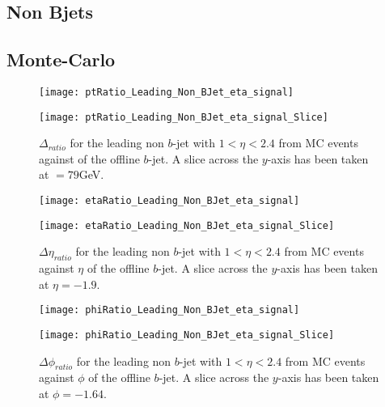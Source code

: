 	\subsection{Non Bjets}

	\subsection{Monte-Carlo}

	\begin{figure}[h]
		\centering
		\begin{minipage}[h]{0.33\linewidth}
			\texttt{[image: ptRatio\_Leading\_Non\_BJet\_eta\_signal]}

		\end{minipage}
		\quad
		\begin{minipage}[h]{0.33\linewidth}
			\texttt{[image: ptRatio\_Leading\_Non\_BJet\_eta\_signal\_Slice]}
		\end{minipage}
		\caption{$\Delta $\pt$_{ratio}$ for the leading \pt non $b$-jet with $1 < \eta < 2.4$ from MC events against \pt of the offline $b$-jet. A slice across the $y$-axis has been taken at \pt$=79$GeV. }
		\label{fig:MC:leadingnonbptcore}
	\end{figure}

	\begin{figure}[h]
		\centering

		\begin{minipage}[h]{0.33\linewidth}
			\texttt{[image: etaRatio\_Leading\_Non\_BJet\_eta\_signal]}
		\end{minipage}
		\quad
		\begin{minipage}[h]{0.33\linewidth}
			\texttt{[image: etaRatio\_Leading\_Non\_BJet\_eta\_signal\_Slice]}
		\end{minipage}
		\caption{$\Delta \eta_{ratio}$ for the leading \pt non $b$-jet with $1 < \eta < 2.4$ from MC events against $\eta$ of the offline $b$-jet. A slice across the $y$-axis has been taken at $\eta=-1.9$. }
		\label{fig:MC:leadingnonbetacore}
	\end{figure}

	\begin{figure}[h]
		\centering

		\begin{minipage}[h]{0.33\linewidth}
			\texttt{[image: phiRatio\_Leading\_Non\_BJet\_eta\_signal]}
		\end{minipage}
		\quad
		\begin{minipage}[h]{0.33\linewidth}
			\texttt{[image: phiRatio\_Leading\_Non\_BJet\_eta\_signal\_Slice]}
		\end{minipage}
		\caption{$\Delta \phi_{ratio}$ for the leading \pt non $b$-jet with $1 < \eta < 2.4$\textbf{} from MC events against $\phi$ of the offline $b$-jet. A slice across the $y$-axis has been taken at $\phi=-1.64$. }
		\label{fig:MC:leadingnonbphicore}
	\end{figure}

